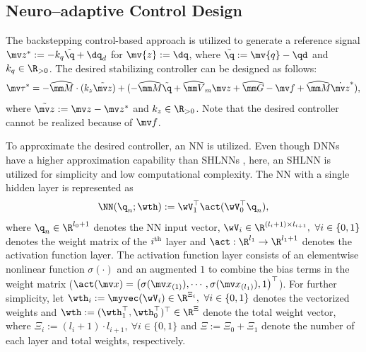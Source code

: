 \documentclass[letterpaper, 10 pt, conference]{ieeeconf}  %
\begin{document}
\subsection{Neuro–adaptive Control Design} \label{sec:ctrl dev}

The backstepping control-based approach is utilized to generate a reference signal $\mv z^*:= -{k_q}\tilde {\q}+\dq_d$ for $\mv {z}:= \dq$, where $\tilde {\q}:= \mv {q} - \qd$ and $k_q\in\R_{>0}$.
The desired stabilizing controller can be designed as follows:
\begin{equation}
    \mv \tau^* = 
    -\widehat{\mm M}\cdot ({k_z}\tilde {\mv z})
    + 
    ( 
        -\widehat{\mm M}\tilde {\q}
        +
        \widehat{\mm V}_m{\mv z}
        +
        \widehat{\mm G}
        -
        \mv f
        +
        \widehat{\mm M} \dot {\mv z}^*
    ) 
    ,
    \label{eq. desired control}
\end{equation}
where $\tilde {\mv z}:= \mv z-\mv z^*$ and $k_z\in\R_{>0}$.
Note that the desired controller cannot be realized because of $\mv f$.

To approximate the desired controller, an NN is utilized.
Even though DNNs have a higher approximation capability than SHLNNs \cite{Rolnick:2018aa}, here, an SHLNN is utilized for simplicity and low computational complexity.
The NN with a single hidden layer is represented as 
\begin{equation}
    \NN({\q_{n}};\wth):= \wV_1^\top \act(\wV_0^\top {\q_{n}})
    ,
\end{equation}
where ${\q_{n}}\in\R^{l_0+1}$ denotes the NN input vector, $\wV_i\in\R^{(l_i+1)\times l_{i+1}},\ \forall i\in\{0,1\}$ denotes the weight matrix of the $i\textsuperscript{th}$ layer and $\act:\R^{l_1}\to\R^{l_1+1}$ denotes the activation function layer.
The activation function layer consists of an elementwise nonlinear function $\sigma(\cdot)$ and an augmented $1$ to combine the bias terms in the weight matrix (\ie $\act(\mv x) = \left(\sigma(\mv x_{(1)}),\cdots, \sigma(\mv x_{(l_1)}), 1\right)^\top $).
For further simplicity, let $\wth_i:= \myvec(\wV_i)\in\R^{\Xi_i},\ \forall i\in\{0,1\}$ denotes the vectorized weights and $\wth:=(\wth_1^\top ,\wth_0^\top )^\top \in\R^{\Xi}$ denote the total weight vector, where $\Xi_i:=(l_i+1)\cdot l_{i+1},\ \forall i\in\{0,1\}$ and $\Xi:=\Xi_0+\Xi_1$ denote the number of each layer and total weights, respectively.
\end{document}
